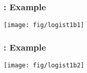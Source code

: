 \begin{frame}
  \frametitle{: Example}
 \begin{center}
  \texttt{[image: fig/logist1b1]}
 \end{center}

\end{frame}

\begin{frame}
  \frametitle{: Example}
 \begin{center}
  \texttt{[image: fig/logist1b2]}
 \end{center}

\end{frame}
